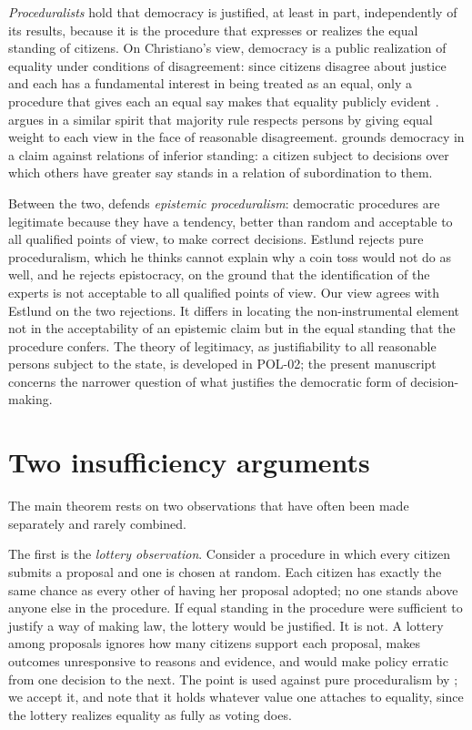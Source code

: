 \documentclass{situationist-preprint}
\begin{document}
\emph{Proceduralists} hold that democracy is justified, at least in part, independently of its results, because it is the procedure that expresses or realizes the equal standing of citizens. On Christiano's view, democracy is a public realization of equality under conditions of disagreement: since citizens disagree about justice and each has a fundamental interest in being treated as an equal, only a procedure that gives each an equal say makes that equality publicly evident \citep{Christiano2008}. \citet{Waldron1999} argues in a similar spirit that majority rule respects persons by giving equal weight to each view in the face of reasonable disagreement. \citet{Kolodny2014a,Kolodny2014b} grounds democracy in a claim against relations of inferior standing: a citizen subject to decisions over which others have greater say stands in a relation of subordination to them.

Between the two, \citet{Estlund2008} defends \emph{epistemic proceduralism}: democratic procedures are legitimate because they have a tendency, better than random and acceptable to all qualified points of view, to make correct decisions. Estlund rejects pure proceduralism, which he thinks cannot explain why a coin toss would not do as well, and he rejects epistocracy, on the ground that the identification of the experts is not acceptable to all qualified points of view. Our view agrees with Estlund on the two rejections. It differs in locating the non-instrumental element not in the acceptability of an epistemic claim but in the equal standing that the procedure confers. The theory of legitimacy, as justifiability to all reasonable persons subject to the state, is developed in POL-02; the present manuscript concerns the narrower question of what justifies the democratic form of decision-making.

\section{Two insufficiency arguments}

The main theorem rests on two observations that have often been made separately and rarely combined.

The first is the \emph{lottery observation}. Consider a procedure in which every citizen submits a proposal and one is chosen at random. Each citizen has exactly the same chance as every other of having her proposal adopted; no one stands above anyone else in the procedure. If equal standing in the procedure were sufficient to justify a way of making law, the lottery would be justified. It is not. A lottery among proposals ignores how many citizens support each proposal, makes outcomes unresponsive to reasons and evidence, and would make policy erratic from one decision to the next. The point is used against pure proceduralism by \citet{Estlund2008}; we accept it, and note that it holds whatever value one attaches to equality, since the lottery realizes equality as fully as voting does.
\end{document}
